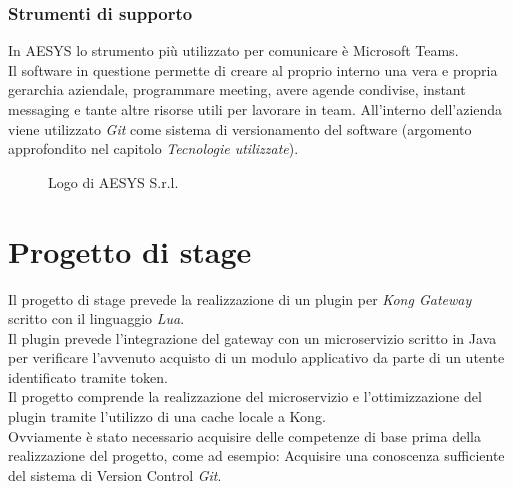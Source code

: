 \subsubsection{Strumenti di supporto}
In AESYS lo strumento più utilizzato per comunicare è Microsoft Teams.\\
Il software in questione permette di creare al proprio interno una vera e propria gerarchia aziendale, programmare meeting, avere agende condivise, instant messaging e tante altre risorse utili per lavorare in team.
All’interno dell’azienda viene utilizzato \emph{Git} come sistema di versionamento del software (argomento approfondito nel capitolo \emph{Tecnologie utilizzate}).\\

\begin{figure}[ht]
	\centering
	\caption{Logo di AESYS S.r.l.}
	\label{fig:one}
\end{figure}

\section{Progetto di stage}\label{sec:progetto}
Il progetto di stage prevede la realizzazione di un plugin per \emph{Kong Gateway} scritto con il linguaggio \emph{Lua}.\\
Il plugin prevede l'integrazione del gateway con un microservizio scritto in Java per verificare l'avvenuto acquisto di un modulo applicativo da parte di un utente identificato tramite token.\\
Il progetto comprende la realizzazione del microservizio e l'ottimizzazione del plugin tramite l'utilizzo di una cache locale a Kong.\\

Ovviamente è stato necessario acquisire delle competenze di base prima della realizzazione del progetto, come ad esempio:
Acquisire una conoscenza sufficiente del sistema di Version Control \emph{Git}.

